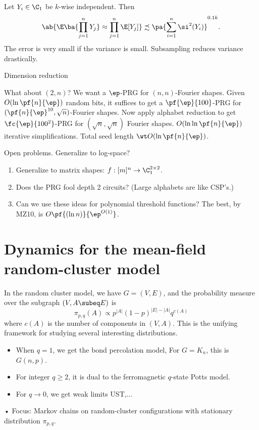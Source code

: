 \begin{lem}
Let $Y_i\in \C_1$ be $k$-wise independent. Then
\[
\ab{\E\ba{\prod_{j=1}^n Y_j}\approx \prod_{j=1}^n \E[Y_j]}\precsim \pa{\sum_{i=1}^n \si^2(Y_i)}^{0.1k}.
\]
The error is very small if the variance is small. Subsampling reduces variance drastically. 

\end{lem}
Dimension reduction

What about $(2,n)$? We want a $\ep$-PRG for $(n,n)$-Fourier shapes. Given $O(\ln \pf{n}{\ep})$ random bits, it suffices to get a $\pf{\ep}{100}$-PRG for $(\pf{n}{\ep}^{10},\sqrt n)$-Fourier shapes. Now apply alphabet reduction to get $\fc{\ep}{100^2}$-PRG for $(\sqrt n, \sqrt n)$ Fourier shapes.
$O(\ln \ln \pf{n}{\ep})$ iterative simplifications. Total seed length $\wt O(\ln\pf{n}{\ep})$. 

Open problems. Generalize to log-space?
\begin{enumerate}
\item
Generalize to matrix shapes: $f:[m]^n\to \C_1^{2\times 2}$.
\item Does the PRG fool depth 2 circuits? (Large alphabets are like CSP's.)
\item
Can we use these ideas for polynomial threshold functions? The best, by MZ10, is $O\pf{(\ln n)}{\ep^{O(1)}}$.
\end{enumerate}







\section{Dynamics for the mean-field random-cluster model}
In the random cluster model, we have $G=(V,E)$, and the probability measure over the subgraph $(V,A\subeq E)$ is
\[
\pi_{p,q}(A)\propto p^{|A|}(1-p)^{|E|-|A|}q^{c(A)}
\]
where $c(A)$ is the number of components in $(V,A)$. This is the unifying framework for studying several interesting distributions.
\begin{itemize}
\item
When $q=1$, we get the bond percolation model, For $G=K_n$, this is $G(n,p)$.
\item
For integer $q\ge 2$, it is dual to the ferromagnetic $q$-state Potts model.
\item
For $q\to 0$, we get weak limits UST,...
\end{itemize}•
Focus: Markov chains on random-cluster configurations with stationary distribution $\pi_{p,q}$.

